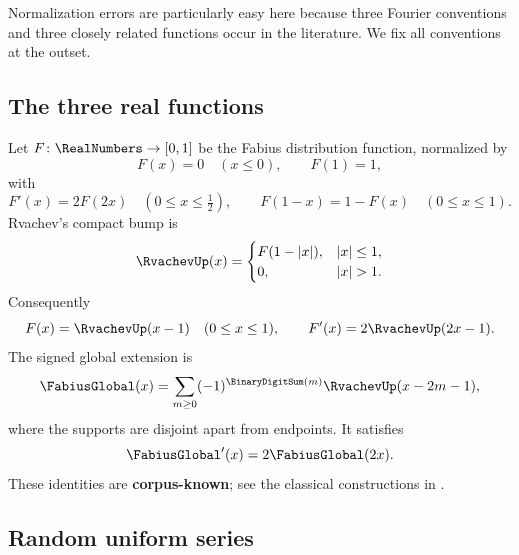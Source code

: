 \documentclass[11pt]{article}
\theoremstyle{definition}
\theoremstyle{remark}
\newcommand{\CorpusKnown}{\textcolor{linkblue}{\textbf{corpus-known}}}
\begin{document}
Normalization errors are particularly easy here because three Fourier conventions and
three closely related functions occur in the literature.  We fix all conventions at
the outset.

\subsection{The three real functions}

Let \(F\colon\RealNumbers\to[0,1]\) be the Fabius distribution function, normalized by
\[
 F(x)=0\quad(x\le0),\qquad F(1)=1,
\]
with
\begin{equation}
 F'(x)=2F(2x)\quad(0\le x\le\tfrac12),
 \qquad F(1-x)=1-F(x)\quad(0\le x\le1).
 \label{p4:eq:F-basic}
\end{equation}
Rvachev's compact bump is
\begin{equation}
 \RvachevUp(x)=
 \begin{cases}
 F(1-|x|),& |x|\le1,\\
 0,& |x|>1.
 \end{cases}
 \label{p4:eq:up-fold}
\end{equation}
Consequently
\begin{equation}
 F(x)=\RvachevUp(x-1)\quad(0\le x\le1),
 \qquad
 F'(x)=2\RvachevUp(2x-1).
 \label{p4:eq:F-up}
\end{equation}
The signed global extension is
\begin{equation}
 \FabiusGlobal(x)=\sum_{m\ge0}(-1)^{\BinaryDigitSum(m)}\RvachevUp(x-2m-1),
 \label{p4:eq:signed-extension}
\end{equation}
where the supports are disjoint apart from endpoints.  It satisfies
\begin{equation}
 \FabiusGlobal'(x)=2\FabiusGlobal(2x).
 \label{p4:eq:global-selfdiff}
\end{equation}
These identities are \CorpusKnown{}; see the classical constructions in
\cite{p4:Fabius1966,p4:Arias1982,p4:Rvachev1990}.

\subsection{Random uniform series}
\end{document}
